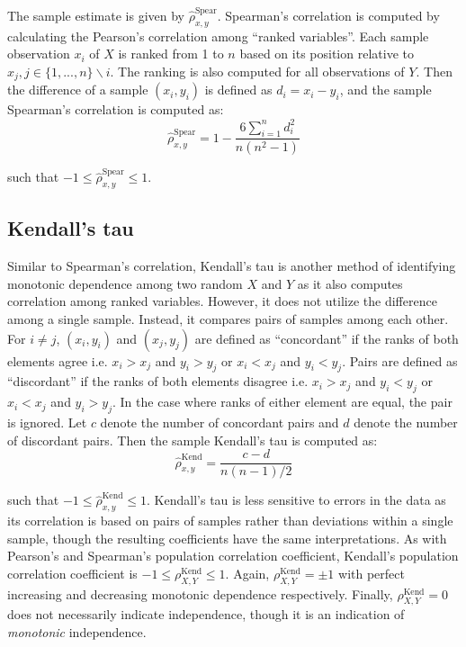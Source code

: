 The sample estimate is given by $\hat{\rho}_{x,y}^{\text{Spear}}$. 
Spearman's correlation is
computed by calculating the Pearson's correlation among ``ranked variables''. 
Each sample observation $x_i$ of $X$ is ranked from 1 to $n$ based on its 
position relative to $x_j, j\in\{1,...,n\}\backslash{i}$. The ranking is also 
computed for all observations of $Y$. Then the difference of a sample 
$(x_i,y_i)$ is defined as $d_i=x_i-y_i$, and the sample Spearman's correlation 
is computed as:
$$\hat{\rho}_{x,y}^{\text{Spear}}=
1-\frac{6 \sum\limits_{i=1}^{n}d_i^2}{n(n^2-1)}$$

\noindent such that $-1 \leq \hat{\rho}_{x,y}^{\text{Spear}} \leq 1$.

\subsection{Kendall's tau}

Similar to Spearman's correlation, Kendall's tau is another method of
identifying monotonic dependence among two random $X$ and $Y$ as it also
computes correlation among ranked variables. However, it does not utilize the
difference among a single sample. Instead, it compares pairs of samples among
each other. For $i\not=j$, $(x_i,y_i)$ and $(x_j,y_j)$ are defined as
``concordant'' if the ranks of both elements agree i.e. $x_i > x_j$ and $y_i >
y_j$ or $x_i < x_j$ and $y_i < y_j$. Pairs are defined as ``discordant'' if the
ranks of both elements disagree i.e. $x_i > x_j$ and $y_i < y_j$ or $x_i < x_j$
and $y_i > y_j$. In the case where ranks of either element are equal, the pair
is ignored. Let $c$ denote the number of concordant pairs and $d$ denote the 
number of discordant pairs. Then the sample Kendall's tau is computed as:
$$\hat{\rho}_{x,y}^{\text{Kend}}=\frac{c-d}{n(n-1)/2}$$

\noindent such that $-1 \leq \hat{\rho}_{x,y}^{\text{Kend}} \leq 1$. 
Kendall's tau is less sensitive to errors in the data as its correlation is
based on pairs of samples rather than deviations within a single sample, though 
the resulting coefficients have the same interpretations. As with Pearson's and 
Spearman's
population correlation coefficient, Kendall's population correlation 
coefficient is $-1 \leq \rho_{X,Y}^{\text{Kend}} \leq 1$. Again, 
$\rho_{X,Y}^{\text{Kend}}=\pm1$ with perfect increasing 
and decreasing monotonic dependence respectively. Finally, 
$\rho_{X,Y}^{\text{Kend}}=0$ does not necessarily indicate
independence, though it is an indication of \textit{monotonic} independence.


